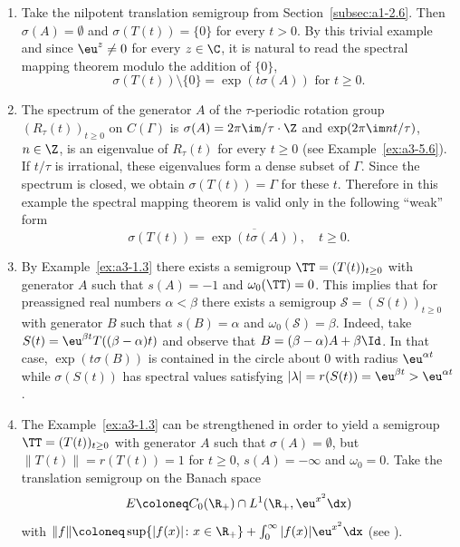 \begin{example}\label{ex:a3-6.1}%
\begin{enumerate}[\upshape (i), wide, labelindent=.25em]

\item
{}
Take the nilpotent translation semigroup from Section~\ref{subsec:a1-2.6}. Then $\sigma(A) = \emptyset$ and $\sigma(T(t)) = \{0\}$ for every $t > 0$.
By this trivial example and since $\eu^{z} \neq 0$ for every $z \in \C$, it is natural to read the spectral mapping theorem modulo the addition of\/ $\{0\}$, \ie 
\[
\sigma(T(t)) \setminus \{0\} = \exp(t\sigma(A))  \text{ for } t \geq 0 .
\]

\item
{}
The spectrum of the generator $A$ of the $\tau$-periodic rotation group $(R_{\tau}(t))_{t \geq 0}$ on $C(\Gamma)$ is $\sigma(A) = 2\pi\im /\tau\cdot\Z$ and $\exp(2\pi\im nt/\tau)$, $n \in \Z$, is an eigenvalue of\/ $R_{\tau}(t)$ for every $t \geq 0$ (see Example~\ref{ex:a3-5.6}).
If\/ $t/\tau$ is irrational, these eigenvalues form a dense subset of\/ $\Gamma$.
Since the spectrum is closed, we obtain $\sigma(T(t)) = \Gamma$ for these $t$.
Therefore in this example the spectral mapping theorem is valid only in the following \enquote{weak} form
\[
\sigma(T(t)) = \overline{\exp(t\sigma(A))}, \quad t \geq 0 .
\]

\item 
By Example~\ref{ex:a3-1.3} there exists a semigroup $\TT = (T(t))_{t \geq 0}$ with generator $A$ such that $s(A) = -1$ and $\omega_{0}(\TT) = 0$.
This implies that for preassigned real numbers $\alpha < \beta$ there exists a semigroup $\mathcal{S} = (S(t))_{t \geq 0}$ with generator $B$ such that $s(B) = \alpha$ and $\omega_{0}(\mathcal{S}) = \beta$. Indeed, take $S(t) = \eu^{\beta t}T((\beta - \alpha)t)$ and observe that $B = (\beta-\alpha)A + \beta\Id$. 
In that case, $\exp(t\sigma(B))$ is contained in the circle about $0$ with radius $\eu^{\alpha t}$ 
while $\sigma(S(t))$ has spectral values satisfying $|\lambda| = r(S(t)) = \eu^{\beta t} > \eu^{\alpha t}$. 


\item 
The Example~\ref{ex:a3-1.3} can be strengthened in order to yield a semigroup $\TT = (T(t))_{t \geq 0}$ with generator $A$ such that $\sigma(A) = \emptyset$, but $\|T(t)\| = r(T(t)) = 1$ for $t \geq 0$, \ie $s(A) = -\infty$ and $\omega_{0} = 0$. 
Take the translation semigroup on the Banach space
\[
E \coloneq C_{0}(\R_{+}) \cap L^{1}(\R_{+}, \eu^{x^{2}}\dx)
\]
with $\|f\| \coloneq \sup \{|f(x)| \colon x \in \R_{+}\} + \int_{0}^{\infty} |f(x)|\eu^{x^{2}} \dx$ (see \textcite{greinervoigtwolff:1981}).


\end{enumerate}
\end{example}
